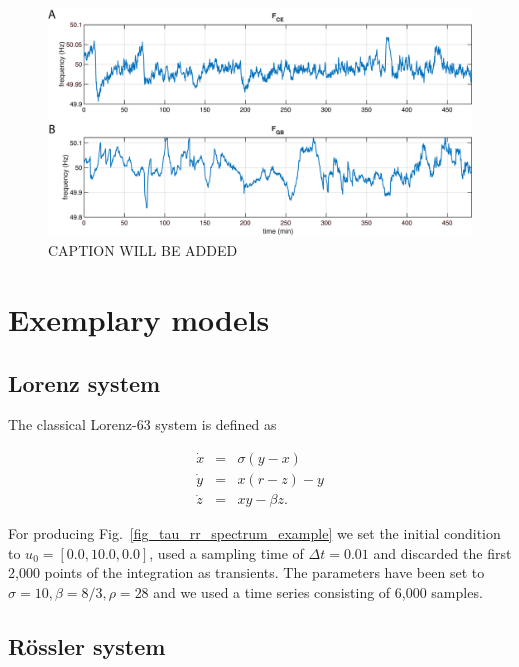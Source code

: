 \documentclass[entropy,article,submit,pdftex,moreauthors]{Definitions/mdpi}
\begin{document}
\begin{figure}
 \centering
 \includegraphics[width=\textwidth]{./figures/fig_power_grid_time_series}
 \caption{CAPTION WILL BE ADDED}
\label{fig_power_grid_time_series}
\end{figure}

\section{Exemplary models}
 
\subsection{Lorenz system}\label{sec_models_lorenz63}

\noindent The classical Lorenz-63 system \cite{lorenz1963} is defined as

\begin{equation}
\begin{array}{rcl}
\dot{x}&=&\sigma(y-x) \\
\dot{y}&=&x(r-z)-y \\
\dot{z}&=&xy - \beta z.
\end{array}
\label{eq_model_Lorenz63}
\end{equation}

\noindent For producing Fig.~\ref{fig_tau_rr_spectrum_example} we set the initial condition to $u_0=[0.0, 10.0, 0.0]$, used a sampling time of $\Delta t=0.01$ and discarded the first 
2,000 points of the integration as transients. The parameters have been set to 
$\sigma=10, \beta=8/3, \rho=28$ and we used a time series consisting of 6,000 samples.

\subsection{R\"ossler system}\label{sec_models_roessler}
\end{document}
